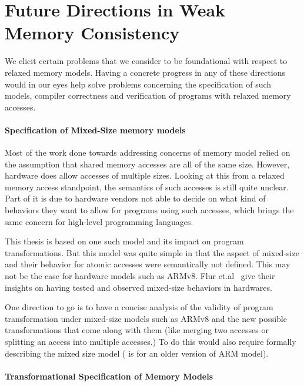 \section{Future Directions in Weak Memory Consistency}

    We elicit certain problems that we consider to be foundational with respect to relaxed memory models.
    Having a concrete progress in any of these directions would in our eyes help solve problems concerning the specification of such models, compiler correctness and verification of programs with relaxed memory accesses.

    \paragraph{Specification of Mixed-Size memory models}

        Most of the work done towards addressing concerns of memory model relied on the assumption that shared memory accesses are all of the same size. 
        However, hardware does allow accesses of multiple sizes. 
        Looking at this from a relaxed memory access standpoint, the semantics of such accesses is still quite unclear. 
        Part of it is due to hardware vendors not able to decide on what kind of behaviors they want to allow for programs using such accesses, which brings the same concern for high-level programming languages. 

        This thesis is based on one such model and its impact on program transformations. 
        But this model was quite simple in that the aspect of mixed-size and their behavior for atomic accesses were semantically not defined. This may not be the case for hardware models such as ARMv8. 
        Flur et.al~\cite{Flur} give their insights on having tested and observed mixed-size behaviors in hardwares.

        One direction to go is to have a concise analysis of the validity of program transformation under mixed-size models such as ARMv8 and the new possible transformations that come along with them (like merging two accesses or splitting an access into multiple accesses.) To do this would also require formally describing the mixed size model (\cite{Flur} is for an older version of ARM model).  

    \paragraph{Transformational Specification of Memory Models}

